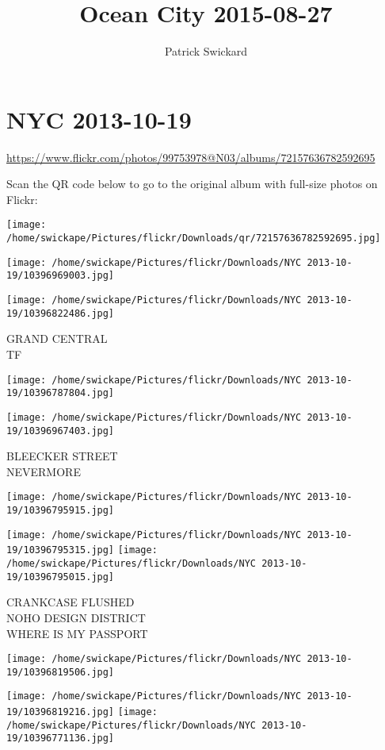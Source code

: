 \documentclass[10pt,letterpaper]{article}
\title{Ocean City 2015-08-27}
\author{Patrick Swickard}
\date{}
\begin{document}
\section*{NYC 2013-10-19}

\url{https://www.flickr.com/photos/99753978@N03/albums/72157636782592695}

Scan the QR code below to go to the original album with full-size photos on Flickr:

\texttt{[image: /home/swickape/Pictures/flickr/Downloads/qr/72157636782592695.jpg]}
\pagebreak

\texttt{[image: /home/swickape/Pictures/flickr/Downloads/NYC 2013-10-19/10396969003.jpg]}

\vspace{0.25in}
\texttt{[image: /home/swickape/Pictures/flickr/Downloads/NYC 2013-10-19/10396822486.jpg]}

GRAND CENTRAL\\
TF
\pagebreak

\texttt{[image: /home/swickape/Pictures/flickr/Downloads/NYC 2013-10-19/10396787804.jpg]}

\vspace{0.25in}
\texttt{[image: /home/swickape/Pictures/flickr/Downloads/NYC 2013-10-19/10396967403.jpg]}

BLEECKER STREET\\
NEVERMORE
\pagebreak

\texttt{[image: /home/swickape/Pictures/flickr/Downloads/NYC 2013-10-19/10396795915.jpg]}

\vspace{0.25in}
\texttt{[image: /home/swickape/Pictures/flickr/Downloads/NYC 2013-10-19/10396795315.jpg]}
\texttt{[image: /home/swickape/Pictures/flickr/Downloads/NYC 2013-10-19/10396795015.jpg]}

CRANKCASE FLUSHED\\
NOHO DESIGN DISTRICT\\
WHERE IS MY PASSPORT
\pagebreak

\texttt{[image: /home/swickape/Pictures/flickr/Downloads/NYC 2013-10-19/10396819506.jpg]}

\vspace{0.25in}
\texttt{[image: /home/swickape/Pictures/flickr/Downloads/NYC 2013-10-19/10396819216.jpg]}
\texttt{[image: /home/swickape/Pictures/flickr/Downloads/NYC 2013-10-19/10396771136.jpg]}
\end{document}
